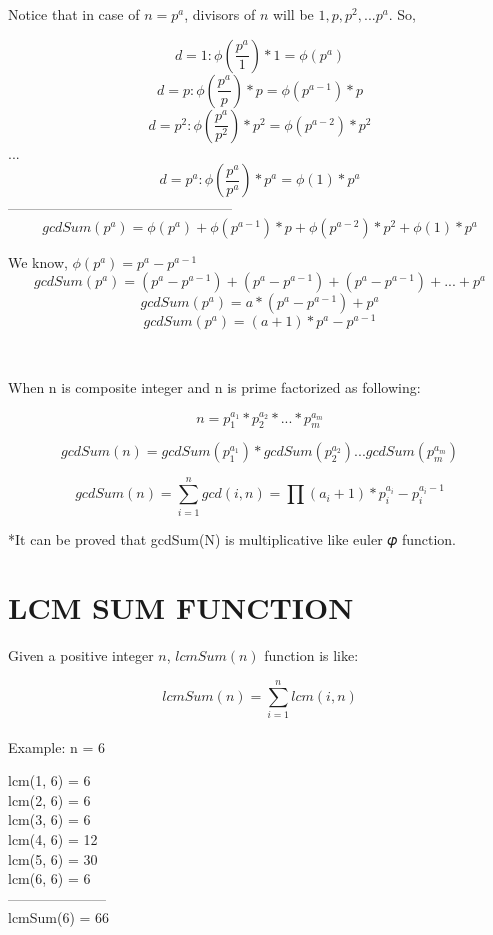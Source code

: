\documentclass[a4paper,12pt]{article}
\begin{document}
Notice that in case of $n = p^a$, divisors of $n$ will be $1, p, p^2, ... p^a$. So,
\begin{center}
$$d = 1: \phi(\frac{p^a}{1}) * 1 = \phi(p^a)$$
$$d = p: \phi(\frac{p^a}{p}) * p = \phi(p^{a-1})*p$$
$$d = p^2: \phi(\frac{p^a}{p^2}) * p^2 = \phi(p^{a-2})*p^2$$
...
$$d = p^a: \phi(\frac{p^a}{p^a}) * p^a = \phi(1)*p^a$$
------------------------------------------------\\
$$gcdSum(p^a) = \phi(p^a) + \phi(p^{a-1})*p + \phi(p^{a-2})*p^2 + \phi(1)*p^a$$

\bigskip
\bigskip

We know, $\phi(p^a) = p^a - p^{a-1}$
$$gcdSum(p^a) = (p^a - p^{a-1}) + (p^a - p^{a-1}) + (p^a - p^{a-1}) + ... + p^a$$
$$gcdSum(p^a) = a * (p^a - p^{a-1}) + p^a$$
$$gcdSum(p^a) = (a + 1) * p^a - p^{a-1}$$
\end{center}\\

\bigskip
\bigskip

When n is composite integer and n is prime factorized as following:

$$n = p_1^{a_1} * p_2^{a_2} * ... * p_m^{a_m}$$ 

$$gcdSum(n) = gcdSum(p_1^{a_1}) * gcdSum(p_2^{a_2}) ... gcdSum(p_m^{a_m})$$

$$gcdSum(n) = \sum_{i=1}^n gcd(i, n) = \prod (a_i + 1) * p_i^{a_i} - p_i^{a_i-1}$$

\bigskip
\bigskip

*It can be proved that gcdSum(N) is multiplicative like euler 𝜑 function.


\section{LCM SUM FUNCTION}
Given a positive integer $n$, $lcmSum(n)$ function is like:

$$lcmSum(n) = \sum_{i=1}^n lcm(i, n)$$
\\

Example: n = 6

\begin{center}
lcm(1, 6) = 6\\
lcm(2, 6) = 6\\
lcm(3, 6) = 6\\
lcm(4, 6) = 12\\
lcm(5, 6) = 30\\
lcm(6, 6) = 6\\
---------------------\\
lcmSum(6) = 66
\end{center}
\end{document}
